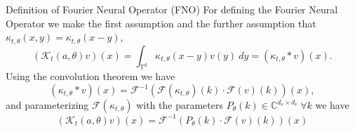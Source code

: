 \documentclass{beamer}
\newcommand{\numberset}{\mathbb}
\newcommand{\C}{\numberset{C}}
\begin{document}
\begin{frame}{Definition of Fourier Neural Operator (FNO)}
	For defining the Fourier Neural Operator we make the first assumption and the further assumption that $\kappa_{t,\theta}(x, y) = \kappa_{t,\theta}(x -y)$,
	\[ (\mathcal{K}_t(a, \theta)v)(x) = \int_{\mathbb{T}^d} \kappa_{t,\theta}(x-y) v(y) \ dy = (\kappa_{t, \theta} * v)(x)  .\]
	Using the convolution theorem we have
	\[ (\kappa_{t, \theta} * v)(x) =  \mathcal{F}^{-1}\left( \mathcal{F}( \kappa_{t,\theta}) (k) \cdot \mathcal{F}(v)(k) \right)(x), \]
	and parameterizing $\mathcal{F}( \kappa_{t, \theta} )$ with the parameters $P_{\theta}(k) \in \C^{d_v \times d_v} \ \forall k $ we have  
	\[  (\mathcal{K}_t(a, \theta)v)(x)= \mathcal{F}^{-1}\left( P_{\theta}(k) \cdot \mathcal{F}(v)(k) \right)(x) \]
\end{frame}

\end{document}
